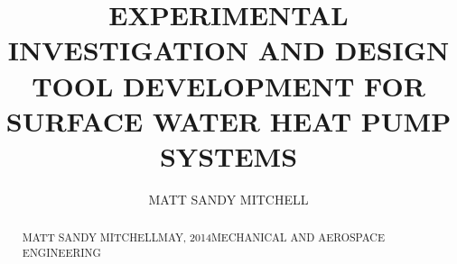 \documentclass[12pt]{osuthesis}
\title{EXPERIMENTAL INVESTIGATION AND DESIGN TOOL DEVELOPMENT FOR SURFACE WATER HEAT PUMP SYSTEMS}
\author{MATT SANDY MITCHELL}
\begin{document}
\maketitle
{} %
\begin{acknowledge}
	
\end{acknowledge}

\renewcommand{\thepage}{\roman{page}}


\begin{abstract}{MATT SANDY MITCHELL}{MAY, 2014}{MECHANICAL AND AEROSPACE ENGINEERING}
    
\end{abstract}

{\msp

\tableofcontents

\listoftables

\listoffigures
}





\setcounter{page}{1}


%

%

%

%

%




%

\end{document}
